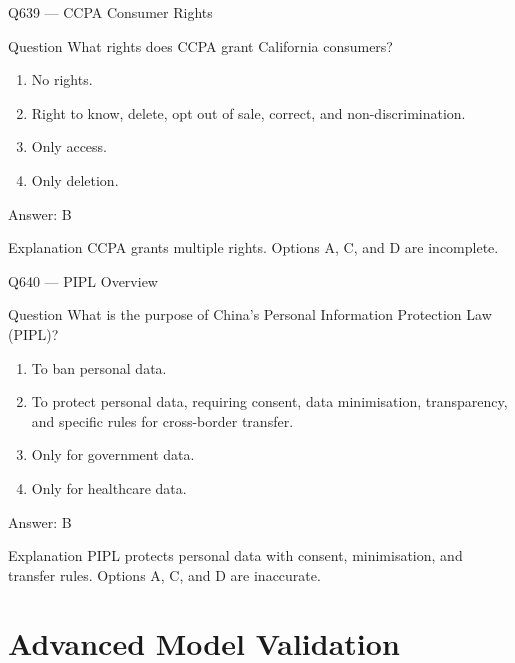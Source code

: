 \documentclass[aspectratio=169,8pt]{beamer}
\begin{document}
	\begin{frame}{Q639 --- CCPA Consumer Rights}
		\begin{block}{Question}
			What rights does CCPA grant California consumers?
			\begin{enumerate}
				\item No rights.
				\item Right to know, delete, opt out of sale, correct, and non-discrimination.
				\item Only access.
				\item Only deletion.
			\end{enumerate}
		\end{block}
		\begin{exampleblock}{Answer: B}\end{exampleblock}
		\begin{block}{Explanation}
			CCPA grants multiple rights. Options A, C, and D are incomplete.
		\end{block}
	\end{frame}
	
	\begin{frame}{Q640 --- PIPL Overview}
		\begin{block}{Question}
			What is the purpose of China's Personal Information Protection Law (PIPL)?
			\begin{enumerate}
				\item To ban personal data.
				\item To protect personal data, requiring consent, data minimisation, transparency, and specific rules for cross-border transfer.
				\item Only for government data.
				\item Only for healthcare data.
			\end{enumerate}
		\end{block}
		\begin{exampleblock}{Answer: B}\end{exampleblock}
		\begin{block}{Explanation}
			PIPL protects personal data with consent, minimisation, and transfer rules. Options A, C, and D are inaccurate.
		\end{block}
	\end{frame}
	
	\section{Advanced Model Validation}
	
\end{document}
